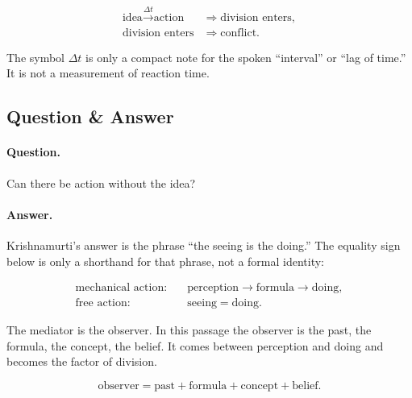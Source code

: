 \documentclass[11pt,oneside]{book}
\begin{document}
\begin{align}
\text{idea}
\xrightarrow{\Delta t}
\text{action}
&\Rightarrow
\text{division enters},\\
\text{division enters}
&\Rightarrow
\text{conflict}.
\end{align}

The symbol \(\Delta t\) is only a compact note for the spoken ``interval'' or ``lag of time.'' It is not a measurement of reaction time.

\subsection{Question \& Answer}

\paragraph{Question.}
Can there be action without the idea?

\paragraph{Answer.}
Krishnamurti's answer is the phrase ``the seeing is the doing.'' The equality sign below is only a shorthand for that phrase, not a formal identity:

\begin{align}
\text{mechanical action:}\quad
&\text{perception}
\rightarrow
\text{formula}
\rightarrow
\text{doing},\\
\text{free action:}\quad
&\text{seeing}
=
\text{doing}.
\end{align}

The mediator is the observer. In this passage the observer is the past, the formula, the concept, the belief. It comes between perception and doing and becomes the factor of division.

\begin{equation}
\text{observer}
=
\text{past}
+
\text{formula}
+
\text{concept}
+
\text{belief}.
\end{equation}
\end{document}
